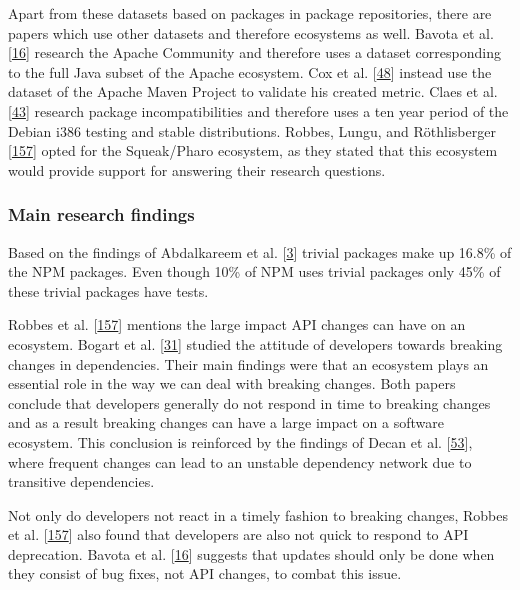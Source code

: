 \documentclass[]{book}
\begin{document}
Apart from these datasets based on packages in package repositories,
there are papers which use other datasets and therefore ecosystems as
well. Bavota et al. {[}\protect\hyperlink{ref-Bavota2014}{16}{]}
research the Apache Community and therefore uses a dataset corresponding
to the full Java subset of the Apache ecosystem. Cox et al.
{[}\protect\hyperlink{ref-Cox2015}{48}{]} instead use the dataset of the
Apache Maven Project to validate his created metric. Claes et al.
{[}\protect\hyperlink{ref-Claes2015}{43}{]} research package
incompatibilities and therefore uses a ten year period of the Debian
i386 testing and stable distributions. Robbes, Lungu, and Röthlisberger
{[}\protect\hyperlink{ref-Robbes2012}{157}{]} opted for the Squeak/Pharo
ecosystem, as they stated that this ecosystem would provide support for
answering their research questions.

\subsubsection{Main research findings}\label{main-research-findings}

Based on the findings of Abdalkareem et al.
{[}\protect\hyperlink{ref-Abdalkareem2017}{3}{]} trivial packages make
up 16.8\% of the NPM packages. Even though 10\% of NPM uses trivial
packages only 45\% of these trivial packages have tests.

Robbes et al. {[}\protect\hyperlink{ref-Robbes2012}{157}{]} mentions the
large impact API changes can have on an ecosystem. Bogart et al.
{[}\protect\hyperlink{ref-Bogart2016}{31}{]} studied the attitude of
developers towards breaking changes in dependencies. Their main findings
were that an ecosystem plays an essential role in the way we can deal
with breaking changes. Both papers conclude that developers generally do
not respond in time to breaking changes and as a result breaking changes
can have a large impact on a software ecosystem. This conclusion is
reinforced by the findings of Decan et al.
{[}\protect\hyperlink{ref-Decan2018}{53}{]}, where frequent changes can
lead to an unstable dependency network due to transitive dependencies.

Not only do developers not react in a timely fashion to breaking
changes, Robbes et al. {[}\protect\hyperlink{ref-Robbes2012}{157}{]}
also found that developers are also not quick to respond to API
deprecation. Bavota et al. {[}\protect\hyperlink{ref-Bavota2014}{16}{]}
suggests that updates should only be done when they consist of bug
fixes, not API changes, to combat this issue.
\end{document}
